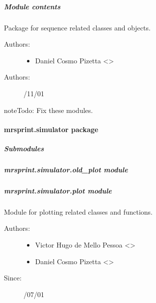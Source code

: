 \documentclass[a4paper,10pt,english]{sphinxmanual}
\begin{document}
\subparagraph{Module contents}
\label{\detokenize{autodoc/mrsprint/mrsprint.sequence:module-mrsprint.sequence}}\label{\detokenize{autodoc/mrsprint/mrsprint.sequence:module-contents}}
Package for sequence related classes and objects.
\begin{description}
\item[{Authors:}] \leavevmode\begin{itemize}
\item {} 
Daniel Cosmo Pizetta \textless{}\textgreater{}

\end{itemize}

\item[{Authors:}] /11/01

\end{description}

\begin{sphinxadmonition}{note}{\label{autodoc/mrsprint/mrsprint.sequence:index-0}Todo:}
Fix these modules.
\end{sphinxadmonition}


\paragraph{mrsprint.simulator package}
\label{\detokenize{autodoc/mrsprint/mrsprint.simulator:mrsprint-simulator-package}}\label{\detokenize{autodoc/mrsprint/mrsprint.simulator::doc}}

\subparagraph{Submodules}
\label{\detokenize{autodoc/mrsprint/mrsprint.simulator:submodules}}

\subparagraph{mrsprint.simulator.old\_plot module}
\label{\detokenize{autodoc/mrsprint/mrsprint.simulator:mrsprint-simulator-old-plot-module}}

\subparagraph{mrsprint.simulator.plot module}
\label{\detokenize{autodoc/mrsprint/mrsprint.simulator:module-mrsprint.simulator.plot}}\label{\detokenize{autodoc/mrsprint/mrsprint.simulator:mrsprint-simulator-plot-module}}
Module for plotting related classes and functions.
\begin{description}
\item[{Authors:}] \leavevmode\begin{itemize}
\item {} 
Victor Hugo de Mello Pessoa \textless{}\textgreater{}

\item {} 
Daniel Cosmo Pizetta \textless{}\textgreater{}

\end{itemize}

\item[{Since:}] /07/01

\end{description}
\end{document}
